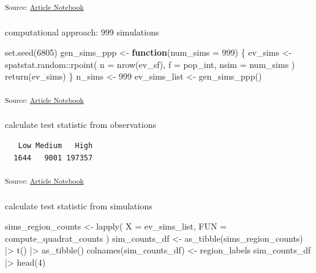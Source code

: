 \documentclass[
  letterpaper,
  DIV=11,
  numbers=noendperiod]{scrartcl}
\makeatletter
\let\oldsubparagraph\subparagraph
\renewcommand{\subparagraph}{
    \@ifstar
      \xxxSubParagraphStar
      \xxxSubParagraphNoStar
  }
\newcommand{\xxxSubParagraphStar}[1]{\oldsubparagraph*{#1}\mbox{}}
\newcommand{\xxxSubParagraphNoStar}[1]{\oldsubparagraph{#1}\mbox{}}
\newenvironment{Shaded}{\begin{snugshade}}{\end{snugshade}}
\newcommand{\AttributeTok}[1]{\textcolor[rgb]{0.40,0.45,0.13}{#1}}
\newcommand{\ControlFlowTok}[1]{\textcolor[rgb]{0.00,0.23,0.31}{\textbf{#1}}}
\newcommand{\DecValTok}[1]{\textcolor[rgb]{0.68,0.00,0.00}{#1}}
\newcommand{\FunctionTok}[1]{\textcolor[rgb]{0.28,0.35,0.67}{#1}}
\newcommand{\NormalTok}[1]{\textcolor[rgb]{0.00,0.23,0.31}{#1}}
\newcommand{\OtherTok}[1]{\textcolor[rgb]{0.00,0.23,0.31}{#1}}
\newcommand{\SpecialCharTok}[1]{\textcolor[rgb]{0.37,0.37,0.37}{#1}}
\makeatother
\begin{document}
\textsubscript{Source:
\href{https://h-christy.github.io/24-manuscript/index.qmd.html}{Article
Notebook}}

\subparagraph{computational approach: 999
simulations}\label{computational-approach-999-simulations}

\begin{Shaded}
\begin{Highlighting}[]
\FunctionTok{set.seed}\NormalTok{(}\DecValTok{6805}\NormalTok{)}
\NormalTok{gen\_sims\_ppp }\OtherTok{\textless{}{-}} \ControlFlowTok{function}\NormalTok{(}\AttributeTok{num\_sims =} \DecValTok{999}\NormalTok{) \{}
\NormalTok{  ev\_sims }\OtherTok{\textless{}{-}}\NormalTok{ spatstat.random}\SpecialCharTok{::}\FunctionTok{rpoint}\NormalTok{(}
    \AttributeTok{n =} \FunctionTok{nrow}\NormalTok{(ev\_sf),}
    \AttributeTok{f =}\NormalTok{ pop\_int,}
    \AttributeTok{nsim =}\NormalTok{ num\_sims}
\NormalTok{    )}
  \FunctionTok{return}\NormalTok{(ev\_sims)}
\NormalTok{\}}
\NormalTok{n\_sims }\OtherTok{\textless{}{-}} \DecValTok{999}
\NormalTok{ev\_sims\_list }\OtherTok{\textless{}{-}} \FunctionTok{gen\_sims\_ppp}\NormalTok{()}
\end{Highlighting}
\end{Shaded}

\textsubscript{Source:
\href{https://h-christy.github.io/24-manuscript/index.qmd.html}{Article
Notebook}}

\subparagraph{calculate test statistic from
observations}\label{calculate-test-statistic-from-observations}

\begin{verbatim}
   Low Medium   High 
  1644   9001 197357 
\end{verbatim}

\textsubscript{Source:
\href{https://h-christy.github.io/24-manuscript/index.qmd.html}{Article
Notebook}}

\subparagraph{calculate test statistic from
simulations}\label{calculate-test-statistic-from-simulations}

\begin{Shaded}
\begin{Highlighting}[]
\NormalTok{sims\_region\_counts }\OtherTok{\textless{}{-}} \FunctionTok{lapply}\NormalTok{(}
  \AttributeTok{X =}\NormalTok{ ev\_sims\_list,}
  \AttributeTok{FUN =}\NormalTok{ compute\_quadrat\_counts}
\NormalTok{)}
\NormalTok{sim\_counts\_df }\OtherTok{\textless{}{-}} \FunctionTok{as\_tibble}\NormalTok{(sims\_region\_counts) }\SpecialCharTok{|\textgreater{}} \FunctionTok{t}\NormalTok{() }\SpecialCharTok{|\textgreater{}} \FunctionTok{as\_tibble}\NormalTok{()}
\FunctionTok{colnames}\NormalTok{(sim\_counts\_df) }\OtherTok{\textless{}{-}}\NormalTok{ region\_labels}
\NormalTok{sim\_counts\_df }\SpecialCharTok{|\textgreater{}} \FunctionTok{head}\NormalTok{(}\DecValTok{4}\NormalTok{)}
\end{Highlighting}
\end{Shaded}
\end{document}
